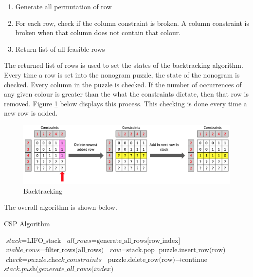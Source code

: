 \documentclass{svproc}
\begin{document}
\begin{enumerate}
    \item Generate all permutation of row
    \item For each row, check if the column constraint is broken. A column constraint is broken when that column does not contain that colour.
    \item Return list of all feasible rows
\end{enumerate}

The returned list of rows is used to set the states of the backtracking algorithm. Every time a row is set into the nonogram puzzle, the state of the nonogram is checked. Every column in the puzzle is checked. If the number of occurrences of any given colour is greater than the what the constraints dictate, then that row is removed. Figure \ref{fig:Backtrack} below displays this process. This checking is done every time a new row is added.

\begin{figure}[h]
    \centering
    \includegraphics[scale=0.36]{Backtracking.png}
    \caption{Backtracking}
    \label{fig:Backtrack}
\end{figure}

The overall algorithm is shown below.

\begin{algorithm}
    \caption{CSP Algorithm}\label{euclid}
    \begin{algorithmic}[1]
        \State $\textit{stack} = \text{LIFO\_stack}$
        \State $\textit{all\_rows} = \text{generate\_all\_rows[row\_index]}$
        \State $\textit{viable\_rows} = \text{filter\_rows(all\_rows)}$
        \State $\textit{row} = \text{stack.pop}$
        \State $\text{puzzle.insert\_row(row)}$
        \State $\textit{check} = \textit{puzzle.check\_constraints}$
        \State $\text{puzzle.delete\_row(row)} \to \text{continue}$
        \EndIf
        \State $\textit{stack.push(generate\_all\_rows(index)}$
        \EndWhile
        \EndWhile
    \end{algorithmic}
\end{algorithm}
\end{document}
